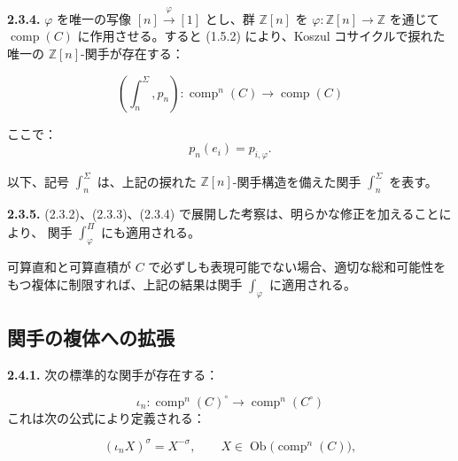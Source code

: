 \clearpage
{}%
\noindent\textbf{2.3.4.}\quad
$\varphi$ を唯一の写像 $[n]\xrightarrow{\varphi}[1]$ とし、群
$\mathbb Z[n]$ を
$\varphi\colon\mathbb Z[n]\longrightarrow\mathbb Z$ を通じて
$\operatorname{comp}(C)$ に作用させる。すると (1.5.2) により、Koszul
コサイクルで捩れた唯一の $\mathbb Z[n]$-関手が存在する：

\begin{equation}
  \left(\int_n^\Sigma,p_n\right)\colon
  \operatorname{comp}^{n}(C)\longrightarrow\operatorname{comp}(C)
  \tag{2.3.4.1}
\end{equation}

ここで：
\begin{equation*}
  p_n(e_i)=p_{i,\varphi}.
\end{equation*}

以下、記号 $\int_n^\Sigma$ は、上記の捩れた
$\mathbb Z[n]$-関手構造を備えた関手 $\int_n^\Sigma$ を表す。

\noindent\textbf{2.3.5.}\quad
(2.3.2)、(2.3.3)、(2.3.4) で展開した考察は、明らかな修正を加えることにより、
関手 $\int_\varphi^\Pi$ にも適用される。

可算直和と可算直積が $C$ で必ずしも表現可能でない場合、適切な総和可能性を
もつ複体に制限すれば、上記の結果は関手 $\int_\varphi$ に適用される。

\subsection{関手の複体への拡張}

\noindent\textbf{2.4.1.}\quad
次の標準的な関手が存在する：

\begin{equation}
  \iota_n\colon
  \operatorname{comp}^{n}(C)^\circ
  \longrightarrow
  \operatorname{comp}^{n}(C^\circ)
  \tag{2.4.1.1}
\end{equation}
これは次の公式により定義される：

\begin{equation*}
  (\iota_nX)^\sigma=X^{-\sigma},
  \qquad X\in\operatorname{Ob}\bigl(\operatorname{comp}^{n}(C)\bigr),
\end{equation*}

